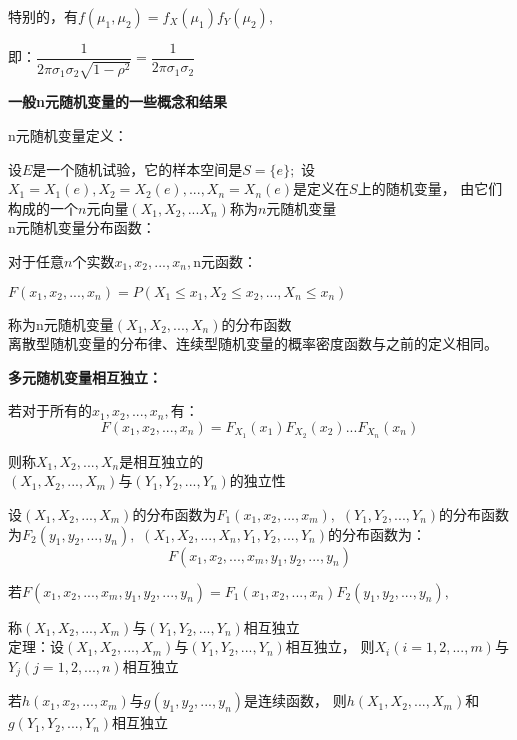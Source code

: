 特别的，有$f(\mu_1,\mu_2)=f_X(\mu_1)f_Y(\mu_2),$

即：$\dfrac{1}{2\pi\sigma_1\sigma_2\sqrt{1-\rho^2}}=\dfrac{1}{2\pi\sigma_1\sigma_2}$


\begin{center}
    \textbf{一般n元随机变量的一些概念和结果}
\end{center}

n元随机变量定义：

设$E$是一个随机试验，它的样本空间是$S=\{e\};$
设$X_1=X_1(e),X_2=X_2(e),...,X_n=X_n(e)$是定义在$S$上的随机变量，
由它们构成的一个$n$元向量$(X_1,X_2,...X_n)$称为$n$元随机变量
~\\

n元随机变量分布函数：

对于任意$n$个实数$x_1,x_2,...,x_n,$n元函数：

$F(x_1,x_2,...,x_n)=P(X_1\leq x_1,X_2\leq x_2,...,X_n\leq x_n)$

称为n元随机变量$(X_1,X_2,...,X_n)$的分布函数
~\\

离散型随机变量的分布律、连续型随机变量的概率密度函数与之前的定义相同。
~\\

\begin{center}
    \textbf{多元随机变量相互独立：}
\end{center}


若对于所有的$x_1,x_2,...,x_n,$有：
$$F(x_1,x_2,...,x_n)=F_{X_1}(x_1)F_{X_2}(x_2)...F_{X_n}(x_n)$$

则称$X_1,X_2,...,X_n$是相互独立的
~\\

$(X_1,X_2,...,X_m)$与$(Y_1,Y_2,...,Y_n)$的独立性


设$(X_1,X_2,...,X_m)$的分布函数为$F_1(x_1,x_2,...,x_m),$
$(Y_1,Y_2,...,Y_n)$的分布函数为$F_2(y_1,y_2,...,y_n),$
$(X_1,X_2,...,X_n,Y_1,Y_2,...,Y_n)$的分布函数为：
$$F(x_1,x_2,...,x_m,y_1,y_2,...,y_n)$$

若$F(x_1,x_2,...,x_m,y_1,y_2,...,y_n)=F_1(x_1,x_2,...,x_n)F_2(y_1,y_2,...,y_n),$

称$(X_1,X_2,...,X_m)$与$(Y_1,Y_2,...,Y_n)$相互独立
~\\

定理：设$(X_1,X_2,...,X_m)$与$(Y_1,Y_2,...,Y_n)$相互独立，
则$X_i(i=1,2,...,m)$与$Y_j(j=1,2,...,n)$相互独立


若$h(x_1,x_2,...,x_m)$与$g(y_1,y_2,...,y_n)$是连续函数，
则$h(X_1,X_2,...,X_m)$和$g(Y_1,Y_2,...,Y_n)$相互独立
~\\

